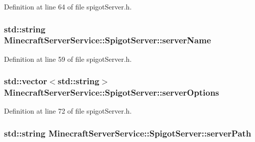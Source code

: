Definition at line 64 of file spigot\+Server.\+h.

\subsubsection[{\texorpdfstring{server\+Name}{serverName}}]{\setlength{\rightskip}{0pt plus 5cm}std\+::string Minecraft\+Server\+Service\+::\+Spigot\+Server\+::server\+Name}\hypertarget{class_minecraft_server_service_1_1_spigot_server_accad32ff846a3e4123749a83a2735a39}{}\label{class_minecraft_server_service_1_1_spigot_server_accad32ff846a3e4123749a83a2735a39}


Definition at line 59 of file spigot\+Server.\+h.

\subsubsection[{\texorpdfstring{server\+Options}{serverOptions}}]{\setlength{\rightskip}{0pt plus 5cm}std\+::vector$<$std\+::string$>$ Minecraft\+Server\+Service\+::\+Spigot\+Server\+::server\+Options\hspace{0.3cm}{\ttfamily [protected]}}\hypertarget{class_minecraft_server_service_1_1_spigot_server_a7a42f5a55caa07437cf121c2dfda60a0}{}\label{class_minecraft_server_service_1_1_spigot_server_a7a42f5a55caa07437cf121c2dfda60a0}


Definition at line 72 of file spigot\+Server.\+h.

\subsubsection[{\texorpdfstring{server\+Path}{serverPath}}]{\setlength{\rightskip}{0pt plus 5cm}std\+::string Minecraft\+Server\+Service\+::\+Spigot\+Server\+::server\+Path\hspace{0.3cm}{\ttfamily [protected]}}\hypertarget{class_minecraft_server_service_1_1_spigot_server_a76f6b550b7fe37a3182e9bc72087a5dc}{}\label{class_minecraft_server_service_1_1_spigot_server_a76f6b550b7fe37a3182e9bc72087a5dc}


